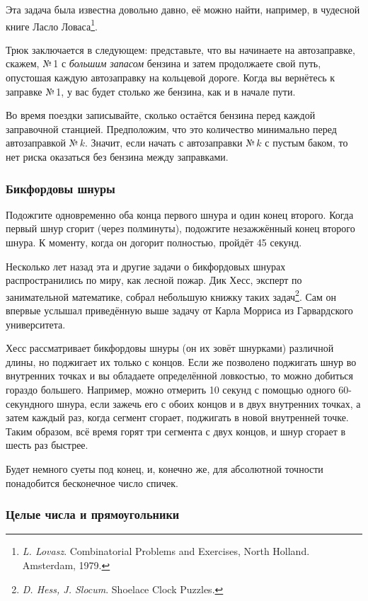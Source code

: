 \documentclass[twoside]{book}
\begin{document}
Эта задача была известна довольно давно, её можно найти, например, в чудесной книге Ласло Ловаса\footnote{\emph{L. Lovasz}. {Combinatorial Problems and Exercises}, North Holland. Amsterdam, 1979.}.

\medskip

Трюк заключается в следующем:
представьте, что вы начинаете на автозаправке, скажем, №\,1 с \emph{большим запасом} бензина и затем продолжаете свой путь, опустошая каждую автозаправку на кольцевой дороге.
Когда вы вернётесь к заправке №\,1, 
у вас будет столько же бензина, как и в начале пути.

Во время поездки записывайте, сколько остаётся бензина перед каждой заправочной станцией.
Предположим, что это количество минимально перед автозаправкой №\,$k$.
Значит, если начать с автозаправки №\,$k$ с пустым баком, то нет риска оказаться без бензина между заправками.
\heart

\subsubsection*{Бикфордовы шнуры} %

Подожгите одновременно оба конца первого шнура и один конец второго.
Когда первый шнур сгорит (через полминуты), подожгите незажжённый конец второго шнура.
К моменту, когда он догорит полностью, пройдёт 45 секунд.
\heart

Несколько лет назад эта и другие задачи о бикфордовых шнурах распространились по миру, как лесной пожар.
Дик Хесс, эксперт по занимательной математике, 
собрал небольшую книжку таких задач\footnote{\emph{D. Hess, J. Slocum}. {Shoelace Clock Puzzles}.}.
Сам он впервые услышал приведённую выше задачу от Карла Морриса из Гарвардского университета.

Хесс рассматривает бикфордовы шнуры (он их зовёт шнурками) различной длины, но поджигает их только с концов.
Если же позволено поджигать шнур во внутренних точках и вы обладаете определённой ловкостью, то можно добиться гораздо большего.
Например, можно отмерить 10 секунд с помощью одного 60-секундного шнура, если зажечь его с обоих концов и в двух внутренних точках, а затем каждый раз, когда сегмент сгорает, поджигать в новой внутренней точке.
Таким образом, всё время горят три сегмента с двух концов, и шнур сгорает в шесть раз быстрее.

Будет немного суеты под конец, и, конечно же, для абсолютной точности
понадобится бесконечное число спичек.

\subsubsection*{Целые числа и прямоугольники} %
\end{document}
